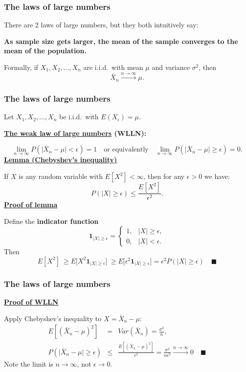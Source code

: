 \documentclass[t,8pt]{beamer}
\begin{document}
\begin{frame}
	\frametitle{The laws of large numbers}
	There are 2 laws of large numbers, but they both intuitively say: \par
	{\bf As sample size gets larger, the mean of the sample converges to the mean of the population.} \par
	Formally, if $X_1,X_2,\dots,X_n$ are i.i.d.\ with mean $\mu$ and variance $\sigma^2$, then
	\[
	\bar X_n \xrightarrow{n\rightarrow\infty} \mu.
	\]
\end{frame}

\begin{frame}
	\frametitle{The laws of large numbers}
	Let $X_1,X_2,\dots,X_n$ be i.i.d.\ with $E(X_i)=\mu$. \par
	{\bf\underline{The weak law of large numbers} (WLLN):} \par
	\[
	\lim_{n\rightarrow\infty} P\left(\vert\bar X_n-\mu\vert<\epsilon\right)=1
	\quad\text{or equivalently}\quad
	\lim_{n\rightarrow\infty}P\left(\vert\bar X_n-\mu\vert\geq\epsilon\right)=0.
	\]
	{\bf\underline{Lemma (Chebyshev's inequality)}} \par
	If $X$ is any random variable with $E[X^2]<\infty$, then for any $\epsilon >0$ we have:
	\[
	P(|X|\geq\epsilon)\leq\frac{E[X^2]}{\epsilon^2}.
	\]
	{\bf\underline{Proof of lemma}} \par
	Define the {\bf indicator function}
	\[
	\mathbf 1_{|X|\geq\epsilon} =
	\begin{cases}
		1, & |X|\geq\epsilon,\\
		0, & |X|<\epsilon.
	\end{cases}
	\]
	Then
	\[
	E[X^2]\ \ge E\big[X^2\mathbf 1_{|X|\geq\epsilon}\big]
	\ \ge E\big[\epsilon^2\mathbf 1_{|X|\geq\epsilon}\big]
	=\epsilon^2P(|X|\geq\epsilon)\quad\blacksquare
	\]
\end{frame}

\begin{frame}
	\frametitle{The laws of large numbers}
	{\bf\underline{Proof of WLLN}} \par
	Apply Chebyshev's inequality to $X=\bar X_n-\mu$:
	\begin{eqnarray*}
		E[(\bar X_n-\mu)^2]
		&=&Var(\bar X_n)
		=\frac{\sigma^2}{n},\\
		P\left(\vert\bar X_n-\mu\vert\geq\epsilon\right)
		&\leq&\frac{E[(\bar X_n-\mu)^2]}{\epsilon^2}
		=\frac{\sigma^2}{n\epsilon^2}
		\xrightarrow{n\rightarrow\infty}0\quad\blacksquare
	\end{eqnarray*}
	{\small\color{NavyBlue}
		Note the limit is $n\rightarrow\infty$, not $\epsilon\rightarrow 0$.
	}
\end{frame}
\end{document}
